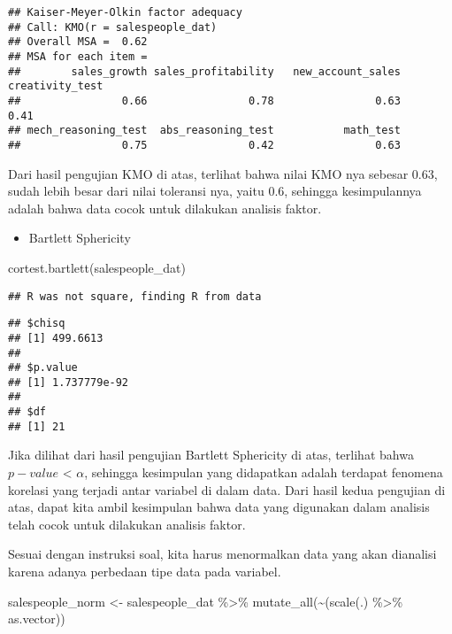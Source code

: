 \documentclass[
]{article}
\newenvironment{Shaded}{\begin{snugshade}}{\end{snugshade}}
\newcommand{\FunctionTok}[1]{\textcolor[rgb]{0.00,0.00,0.00}{#1}}
\newcommand{\NormalTok}[1]{#1}
\newcommand{\OtherTok}[1]{\textcolor[rgb]{0.56,0.35,0.01}{#1}}
\newcommand{\SpecialCharTok}[1]{\textcolor[rgb]{0.00,0.00,0.00}{#1}}
\providecommand{\tightlist}{%
  \setlength{\itemsep}{0pt}\setlength{\parskip}{0pt}}
\begin{document}
\begin{verbatim}
## Kaiser-Meyer-Olkin factor adequacy
## Call: KMO(r = salespeople_dat)
## Overall MSA =  0.62
## MSA for each item = 
##        sales_growth sales_profitability   new_account_sales     creativity_test 
##                0.66                0.78                0.63                0.41 
## mech_reasoning_test  abs_reasoning_test           math_test 
##                0.75                0.42                0.63
\end{verbatim}

Dari hasil pengujian KMO di atas, terlihat bahwa nilai KMO nya sebesar
0.63, sudah lebih besar dari nilai toleransi nya, yaitu 0.6, sehingga
kesimpulannya adalah bahwa data cocok untuk dilakukan analisis faktor.

\begin{itemize}
\tightlist
\item
  Bartlett Sphericity
\end{itemize}

\begin{Shaded}
\begin{Highlighting}[]
\FunctionTok{cortest.bartlett}\NormalTok{(salespeople\_dat)}
\end{Highlighting}
\end{Shaded}

\begin{verbatim}
## R was not square, finding R from data
\end{verbatim}

\begin{verbatim}
## $chisq
## [1] 499.6613
## 
## $p.value
## [1] 1.737779e-92
## 
## $df
## [1] 21
\end{verbatim}

Jika dilihat dari hasil pengujian Bartlett Sphericity di atas, terlihat
bahwa \(p-value\) \textless{} \(\alpha\), sehingga kesimpulan yang
didapatkan adalah terdapat fenomena korelasi yang terjadi antar variabel
di dalam data. Dari hasil kedua pengujian di atas, dapat kita ambil
kesimpulan bahwa data yang digunakan dalam analisis telah cocok untuk
dilakukan analisis faktor.

Sesuai dengan instruksi soal, kita harus menormalkan data yang akan
dianalisi karena adanya perbedaan tipe data pada variabel.

\begin{Shaded}
\begin{Highlighting}[]
\NormalTok{salespeople\_norm }\OtherTok{\textless{}{-}}\NormalTok{ salespeople\_dat }\SpecialCharTok{\%\textgreater{}\%} \FunctionTok{mutate\_all}\NormalTok{(}\SpecialCharTok{\textasciitilde{}}\NormalTok{(}\FunctionTok{scale}\NormalTok{(.) }\SpecialCharTok{\%\textgreater{}\%}\NormalTok{ as.vector))}
\end{Highlighting}
\end{Shaded}
\end{document}
